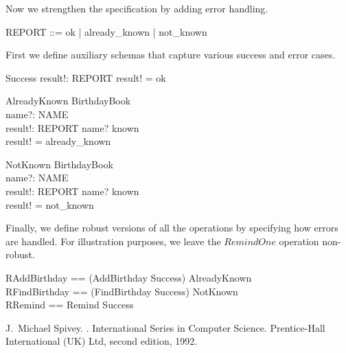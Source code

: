 \documentclass{article}
\begin{document}
Now we strengthen the specification by adding error handling.

\begin{zed}
    REPORT ::= ok | already\_known | not\_known
\end{zed}

First we define auxiliary schemas that capture various success
and error cases.

\begin{schema}{Success}
    result!: REPORT
\where
    result! = ok
\end{schema}

\begin{schema}{AlreadyKnown}
    \Xi BirthdayBook \\
    name?: NAME \\
    result!: REPORT
\where
    name? \in known \\
    result! = already\_known
\end{schema}


\begin{schema}{NotKnown}
    \Xi BirthdayBook \\
    name?: NAME \\
    result!: REPORT
\where
    name? \notin known \\
    result! = not\_known
\end{schema}

Finally, we define robust versions of all the operations
by specifying how errors are handled.
For illustration purposes, we leave the $RemindOne$ operation non-robust.

\begin{zed}
    RAddBirthday == (AddBirthday \land Success) \lor AlreadyKnown \\
    RFindBirthday == (FindBirthday \land Success) \lor NotKnown \\
    RRemind == Remind \land Success
\end{zed}


\begin{thebibliography}{1}
J.~Michael Spivey.
.
\newblock International Series in Computer Science. Prentice-Hall International
  (UK) Ltd, second edition, 1992.
\end{thebibliography}
\end{document}
